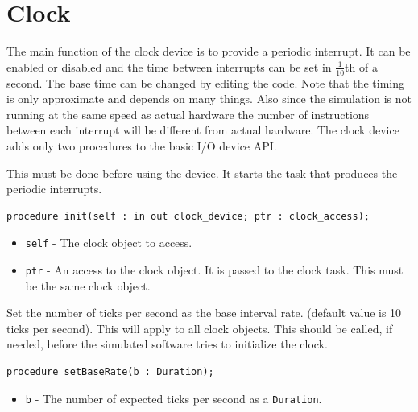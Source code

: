 \documentclass[10pt, openany]{book}
\newcommand{\keyword}[1]{\texttt{#1}}
\newcommand{\datatype}[1]{\texttt{#1}}
\begin{document}
\section{Clock}
The main function of the clock device is to provide a periodic interrupt.
It can be enabled or disabled and the time between interrupts can be set in $\frac{1}{10}$th of a second.
The base time can be changed by editing the code.
Note that the timing is only approximate and depends on many things.
Also since the simulation is not running at the same speed as actual hardware the number of instructions between each interrupt will be different from actual hardware.
The clock device adds only two procedures to the basic I/O device API.

This must be done before using the device.
It starts the task that produces the periodic interrupts.
\begin{lstlisting}
procedure init(self : in out clock_device; ptr : clock_access);
\end{lstlisting}
\begin{itemize}
  \item \keyword{self} - The clock object to access.
  \item \keyword{ptr} - An access to the clock object.  It is passed to the clock task.  This must be the same clock object.
\end{itemize}

Set the number of ticks per second as the base interval rate.
(default value is 10 ticks per second).
This will apply to all clock objects.
This should be called, if needed, before the simulated software tries to initialize the clock.
\begin{lstlisting}
procedure setBaseRate(b : Duration);
\end{lstlisting}
\begin{itemize}
  \item \keyword{b} - The number of expected ticks per second as a \datatype{Duration}.
\end{itemize}
\end{document}
